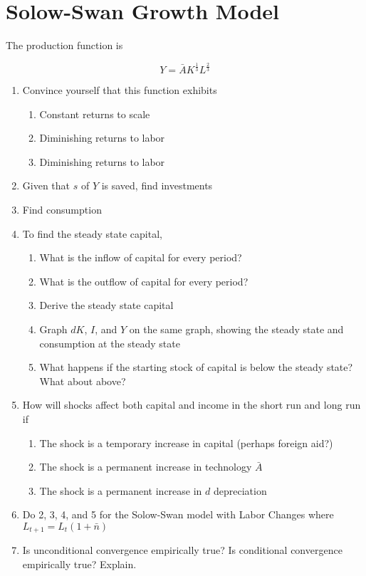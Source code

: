 \documentclass[11pt]{scrartcl}
\newcommand{\oneth}{\ensuremath{\frac{1}{3}}}
\newcommand{\twoth}{\ensuremath{\frac{2}{3}}}
\begin{document}
\section{Solow-Swan Growth Model}

The production function is

\[ Y = \bar{A}K^{\oneth}L^{\twoth} \]

\begin{enumerate}
\item Convince yourself that this function exhibits
\begin{enumerate}
\item Constant returns to scale
\item Diminishing returns to labor
\item Diminishing returns to labor
\end{enumerate}
\item Given that $s$ of $Y$ is saved, find investments
\item Find consumption
\item To find the steady state capital,
\begin{enumerate}
\item What is the inflow of capital for every period?
\item What is the outflow of capital for every period?
\item Derive the steady state capital
\item Graph $dK$, $I$, and $Y$ on the same graph, showing the steady state and consumption at the steady state
\item What happens if the starting stock of capital is below the steady state? What about above?
\end{enumerate}
\item How will shocks affect both capital and income in the short run and long run if
\begin{enumerate}
\item The shock is a temporary increase in capital (perhaps foreign aid?)
\item The shock is a permanent increase in technology $\bar{A}$
\item The shock is a permanent increase in $d$ depreciation
\end{enumerate}
\item Do 2, 3, 4, and 5 for the Solow-Swan model with Labor Changes where $L_{t+1} = L_t (1+\bar{n})$
\item Is unconditional convergence empirically true? Is conditional convergence empirically true? Explain.
\end{enumerate}
\end{document}
